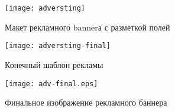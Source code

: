 \begin{figure}[H]
    \centering
    \texttt{[image: adversting]}
    \caption{Макет рекламного \gls{banner}а с разметкой полей}\label{fig:adversting-template}
\end{figure}

\begin{figure}[htpb]
    \centering
    \texttt{[image: adversting-final]}
    \caption{Конечный шаблон рекламы}\label{fig:adversting-final}
\end{figure}

\begin{figure}[htpb]
    \centering
    \texttt{[image: adv-final.eps]}
    \caption{Финальное изображение рекламного баннера}%
    \label{fig:adv-final}
\end{figure}
